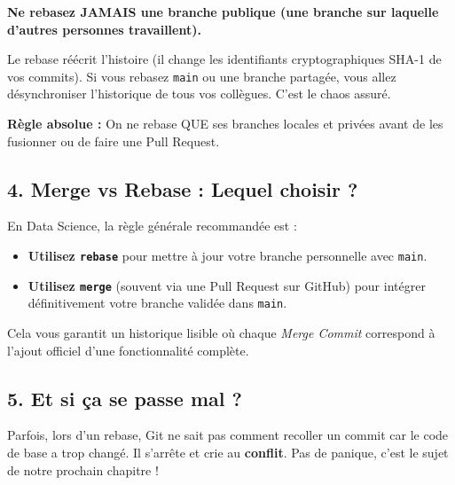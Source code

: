 \documentclass[
  letterpaper,
  DIV=11,
  numbers=noendperiod]{scrreprt}
\begin{document}
\begin{tcolorbox}[enhanced jigsaw, arc=.35mm, bottomrule=.15mm, bottomtitle=1mm, breakable, colback=white, colbacktitle=quarto-callout-warning-color!10!white, colframe=quarto-callout-warning-color-frame, coltitle=black, left=2mm, leftrule=.75mm, opacityback=0, opacitybacktitle=0.6, rightrule=.15mm, title=\textcolor{quarto-callout-warning-color}{\faExclamationTriangle}\hspace{0.5em}{NE FAITES JAMAIS CELA !}, titlerule=0mm, toprule=.15mm, toptitle=1mm]

\textbf{Ne rebasez JAMAIS une branche publique (une branche sur laquelle
d'autres personnes travaillent).}

Le rebase réécrit l'histoire (il change les identifiants
cryptographiques SHA-1 de vos commits). Si vous rebasez \texttt{main} ou
une branche partagée, vous allez désynchroniser l'historique de tous vos
collègues. C'est le chaos assuré.

\textbf{Règle absolue :} On ne rebase QUE ses branches locales et
privées avant de les fusionner ou de faire une Pull Request.

\end{tcolorbox}

\subsection{4. Merge vs Rebase : Lequel choisir
?}\label{merge-vs-rebase-lequel-choisir}

En Data Science, la règle générale recommandée est :

\begin{itemize}
\item
  \textbf{Utilisez \texttt{rebase}} pour mettre à jour votre branche
  personnelle avec \texttt{main}.
\item
  \textbf{Utilisez \texttt{merge}} (souvent via une Pull Request sur
  GitHub) pour intégrer définitivement votre branche validée dans
  \texttt{main}.
\end{itemize}

Cela vous garantit un historique lisible où chaque \emph{Merge Commit}
correspond à l'ajout officiel d'une fonctionnalité complète.

\subsection{5. Et si ça se passe mal ?}\label{et-si-uxe7a-se-passe-mal}

Parfois, lors d'un rebase, Git ne sait pas comment recoller un commit
car le code de base a trop changé. Il s'arrête et crie au
\textbf{conflit}. Pas de panique, c'est le sujet de notre prochain
chapitre !
\end{document}
